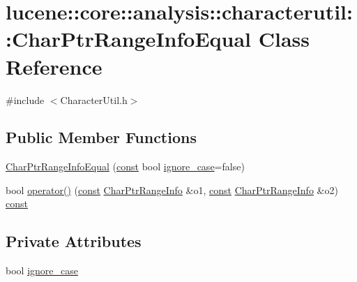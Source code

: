 \hypertarget{classlucene_1_1core_1_1analysis_1_1characterutil_1_1CharPtrRangeInfoEqual}{}\section{lucene\+:\+:core\+:\+:analysis\+:\+:characterutil\+:\+:Char\+Ptr\+Range\+Info\+Equal Class Reference}
\label{classlucene_1_1core_1_1analysis_1_1characterutil_1_1CharPtrRangeInfoEqual}


{\ttfamily \#include $<$Character\+Util.\+h$>$}

\subsection*{Public Member Functions}
\begin{DoxyCompactItemize}
\item 
\mbox{\hyperlink{classlucene_1_1core_1_1analysis_1_1characterutil_1_1CharPtrRangeInfoEqual_a206c844633345c152f772b82d6802ce6}{Char\+Ptr\+Range\+Info\+Equal}} (\mbox{\hyperlink{ZlibCrc32_8h_a2c212835823e3c54a8ab6d95c652660e}{const}} bool \mbox{\hyperlink{classlucene_1_1core_1_1analysis_1_1characterutil_1_1CharPtrRangeInfoEqual_a35cd49cc9665460db909c8c3ed635c27}{ignore\+\_\+case}}=false)
\item 
bool \mbox{\hyperlink{classlucene_1_1core_1_1analysis_1_1characterutil_1_1CharPtrRangeInfoEqual_a8cfbaa4e5fedbe76c6a1df2e7788ba75}{operator()}} (\mbox{\hyperlink{ZlibCrc32_8h_a2c212835823e3c54a8ab6d95c652660e}{const}} \mbox{\hyperlink{classlucene_1_1core_1_1analysis_1_1characterutil_1_1CharPtrRangeInfo}{Char\+Ptr\+Range\+Info}} \&o1, \mbox{\hyperlink{ZlibCrc32_8h_a2c212835823e3c54a8ab6d95c652660e}{const}} \mbox{\hyperlink{classlucene_1_1core_1_1analysis_1_1characterutil_1_1CharPtrRangeInfo}{Char\+Ptr\+Range\+Info}} \&o2) \mbox{\hyperlink{ZlibCrc32_8h_a2c212835823e3c54a8ab6d95c652660e}{const}}
\end{DoxyCompactItemize}
\subsection*{Private Attributes}
\begin{DoxyCompactItemize}
\item 
bool \mbox{\hyperlink{classlucene_1_1core_1_1analysis_1_1characterutil_1_1CharPtrRangeInfoEqual_a35cd49cc9665460db909c8c3ed635c27}{ignore\+\_\+case}}
\end{DoxyCompactItemize}


